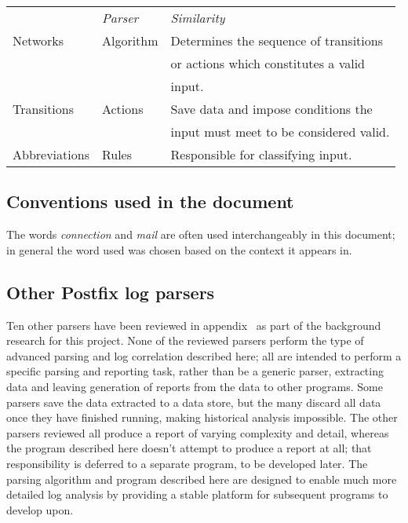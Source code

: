 
\begin{tabular}[]{lll}
    \textit{\ATN{}\/}   & \textit{Parser\/} & \textit{Similarity\/}     \\
    Networks            & Algorithm         & Determines the sequence 
                                              of transitions            \\
                        &                   & or actions which 
                                              constitutes a valid       \\
                        &                   & input.                    \\
    Transitions         & Actions           & Save data and impose
                                              conditions the            \\
                        &                   & input must meet to be
                                              considered valid.         \\
    Abbreviations       & Rules             & Responsible for 
                                              classifying input.        \\
\end{tabular}

\subsection{Conventions used in the document}

The words \textit{connection\/} and \textit{mail\/} are often used
interchangeably in this document; in general the word used was chosen based
on the context it appears in.

\subsection{Other Postfix log parsers}

Ten other parsers have been reviewed in
appendix~ as part of the background research for
this project.  None of the reviewed parsers perform the type of advanced
parsing and log correlation described here; all are intended to perform a
specific parsing and reporting task, rather than be a generic parser,
extracting data and leaving generation of reports from the data to other
programs.  Some parsers save the data extracted to a data store, but the
many discard all data once they have finished running, making historical
analysis impossible.  The other parsers reviewed all produce a report of
varying complexity and detail, whereas the program described here doesn't
attempt to produce a report at all; that responsibility is deferred to a
separate program, to be developed later.  The parsing algorithm and program
described here are designed to enable much more detailed log analysis by
providing a stable platform for subsequent programs to develop upon.

